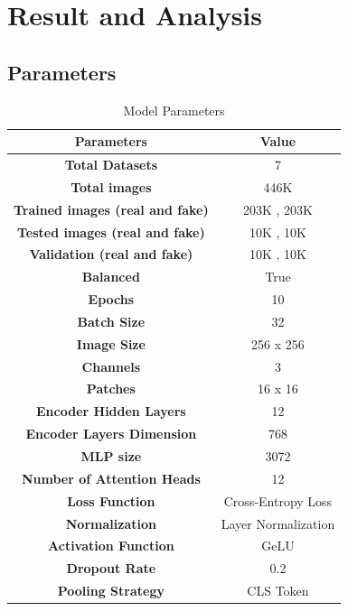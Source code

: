 \section{Result and Analysis}
\subsection{Parameters}
\begin{table}[h]
    \centering
    \renewcommand{\arraystretch}{1.5} %
    \begin{tabular}{|c|c|}
        \hline
        \textbf{Parameters} & \textbf{Value} \\
        \hline
        \textbf{Total Datasets} & 7  \\
        \hline
        \textbf{Total images} & 446K  \\
        \hline
        \textbf{Trained images (real and fake)} & 203K , 203K \\
        \hline
        \textbf{Tested images (real and fake)} & 10K , 10K \\
        \hline
        \textbf{Validation (real and fake)} & 10K , 10K \\
        \hline
        \textbf{Balanced} &  True\\
        \hline
        \textbf{Epochs} &  10\\
        \hline
        \textbf{Batch Size} &  32\\
        \hline
        \textbf{Image Size} &  256 x 256\\
        \hline
        \textbf{Channels} &  3\\
        \hline
        \textbf{Patches} & 16 x 16\\
        \hline
        \textbf{Encoder Hidden Layers} & 12\\
        \hline
        \textbf{Encoder Layers Dimension} & 768\\
        \hline
        \textbf{MLP size} & 3072\\
        \hline
        \textbf{ Number of Attention Heads } & 12\\
        \hline
        
        \textbf{Loss Function} & Cross-Entropy Loss \\
        \hline
        \textbf{Normalization} & Layer Normalization \\
        \hline
        \textbf{Activation Function} & GeLU \\
        \hline
        \textbf{Dropout Rate } & 0.2  \\
        \hline
        \textbf{Pooling Strategy } & CLS Token \\
        \hline
    \end{tabular}
    \caption{Model Parameters}
    \label{tab:model-parameters}
\end{table}
